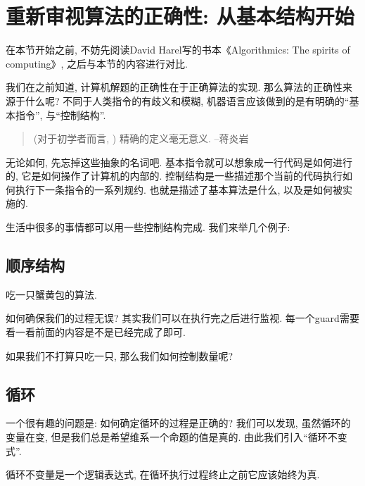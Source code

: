 


\section{重新审视算法的正确性: 从基本结构开始}

\begin{prob}
	在本节开始之前, 不妨先阅读David Harel写的书本《Algorithmics: The spirits of computing》, 之后与本节的内容进行对比. 
\end{prob}


我们在之前知道, 计算机解题的正确性在于正确算法的实现. 那么算法的正确性来源于什么呢? 不同于人类指令的有歧义和模糊, 机器语言应该做到的是有明确的``基本指令'', 与``控制结构''.

\begin{quote}
	(对于初学者而言, ) 精确的定义毫无意义. \hfill --蒋炎岩
\end{quote} 

无论如何, 先忘掉这些抽象的名词吧. 基本指令就可以想象成一行代码是如何进行的, 它是如何操作了计算机的内部的. 控制结构是一些描述那个当前的代码执行如何执行下一条指令的一系列规约. 也就是描述了基本算法是什么, 以及是如何被实施的. 


生活中很多的事情都可以用一些控制结构完成. 我们来举几个例子:

\subsection*{顺序结构}

\begin{example}
	吃一只蟹黄包的算法. 
\end{example}

如何确保我们的过程无误? 其实我们可以在执行完之后进行监视. 每一个guard需要看一看前面的内容是不是已经完成了即可. 

如果我们不打算只吃一只, 那么我们如何控制数量呢? 

\subsection*{循环}

一个很有趣的问题是: 如何确定循环的过程是正确的? 我们可以发现, 虽然循环的变量在变, 但是我们总是希望维系一个命题的值是真的. 由此我们引入``循环不变式''. 

\begin{definition}[循环不变式]
	循环不变量是一个逻辑表达式, 在循环执行过程终止之前它应该始终为真. 
\end{definition}

